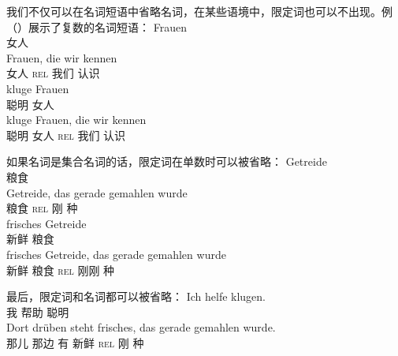 我们不仅可以在名词短语中省略名词，在某些语境中，限定词也可以不出现。例（）展示了复数的名词短语：
\eal
\ex 
\gll Frauen\\
	 女人\\
\ex 
\gll Frauen, die wir kennen\\
	 女人 \textsc{rel} 我们 认识\\
\ex 
\gll kluge Frauen\\
	 聪明 女人\\
\ex 
\gll kluge Frauen, die wir kennen\\
	 聪明 女人 \textsc{rel} 我们 认识\\
\zl

如果名词是集合名词的话，限定词在单数时可以被省略：
\eal
\ex 
\gll Getreide\\
	 粮食\\
\ex 
\gll Getreide, das gerade gemahlen wurde\\
	 粮食 \textsc{rel} 刚 种 \passivepst{}\\
\ex 
\gll frisches Getreide\\
	 新鲜 粮食\\
\ex 
\gll frisches Getreide, das gerade gemahlen wurde\\
	 新鲜 粮食 \textsc{rel} 刚刚 种 \passivepst{}\\
\zl

最后，限定词和名词都可以被省略：
\eal
\ex 
\gll Ich helfe klugen.\\
	 我 帮助 聪明\\
\ex 
\gll Dort drüben steht frisches, das gerade gemahlen wurde.\\
	 那儿 那边 有 新鲜 \textsc{rel} 刚 种 \passivepst{}\\
\zl

